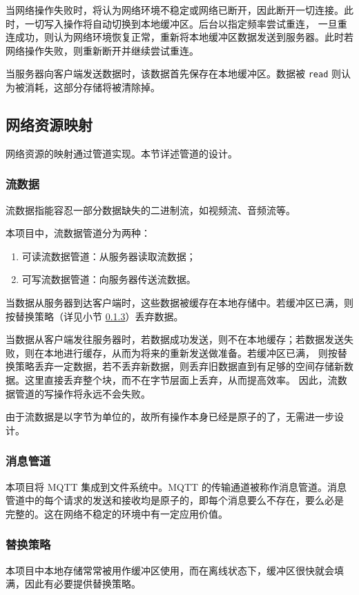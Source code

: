 \documentclass{ctexart}
\begin{document}
当网络操作失败时，将认为网络环境不稳定或网络已断开，因此断开一切连接。此时，一切写入操作将自动切换到本地缓冲区。后台以指定频率尝试重连，
一旦重连成功，则认为网络环境恢复正常，重新将本地缓冲区数据发送到服务器。此时若网络操作失败，则重新断开并继续尝试重连。

当服务器向客户端发送数据时，该数据首先保存在本地缓冲区。数据被 \verb|read| 则认为被消耗，这部分存储将被清除掉。

\subsection{网络资源映射}
网络资源的映射通过管道实现。本节详述管道的设计。

\subsubsection{流数据}
\label{design-stream}
流数据指能容忍一部分数据缺失的二进制流，如视频流、音频流等。

本项目中，流数据管道分为两种：
\begin{enumerate}
	\item 可读流数据管道：从服务器读取流数据；
	\item 可写流数据管道：向服务器传送流数据。
\end{enumerate}

当数据从服务器到达客户端时，这些数据被缓存在本地存储中。若缓冲区已满，则按替换策略（详见小节 \ref{design-replace}）丢弃数据。

当数据从客户端发往服务器时，若数据成功发送，则不在本地缓存；若数据发送失败，则在本地进行缓存，从而为将来的重新发送做准备。若缓冲区已满，
则按替换策略丢弃一定数据，若不丢弃新数据，则丢弃旧数据直到有足够的空间存储新数据。这里直接丢弃整个块，而不在字节层面上丢弃，从而提高效率。
因此，流数据管道的写操作将永远不会失败。

由于流数据是以字节为单位的，故所有操作本身已经是原子的了，无需进一步设计。

\subsubsection{消息管道}
\label{design-mqtt}
本项目将 MQTT 集成到文件系统中。MQTT 的传输通道被称作消息管道。消息管道中的每个请求的发送和接收均是原子的，即每个消息要么不存在，要么必是
完整的。这在网络不稳定的环境中有一定应用价值。

\subsubsection{替换策略}
\label{design-replace}
本项目中本地存储常常被用作缓冲区使用，而在离线状态下，缓冲区很快就会填满，因此有必要提供替换策略。
\end{document}
